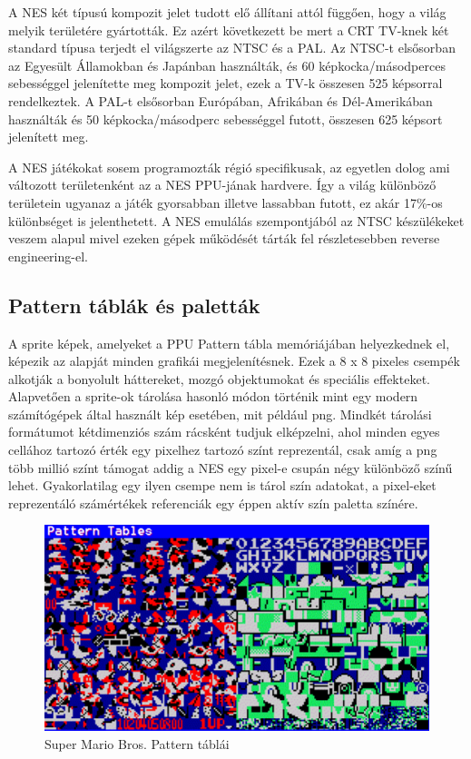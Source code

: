 	A NES két típusú kompozit jelet tudott elő állítani attól függően, hogy a világ melyik területére gyártották. Ez azért következett be mert a CRT TV-knek két standard típusa terjedt el világszerte az NTSC és a PAL. Az NTSC-t elsősorban az Egyesült Államokban és Japánban használták, és 60 képkocka/másodperces sebességgel jelenítette meg kompozit jelet, ezek a TV-k összesen 525 képsorral rendelkeztek. A PAL-t elsősorban Európában, Afrikában és Dél-Amerikában használták és 50 képkocka/másodperc sebességgel futott, összesen 625 képsort jelenített meg.
	
	A NES játékokat sosem programozták régió specifikusak, az egyetlen dolog ami változott területenként az a NES PPU-jának hardvere. Így a világ különböző területein ugyanaz a játék gyorsabban illetve lassabban futott, ez akár 17\%-os különbséget is jelenthetett. A NES emulálás szempontjából az NTSC készülékeket veszem alapul mivel ezeken gépek működését tárták fel részletesebben reverse engineering-el.
	
	\subsection{Pattern táblák és paletták}
	A sprite képek, amelyeket a PPU Pattern tábla memóriájában helyezkednek el, képezik az alapját minden grafikái megjelenítésnek. Ezek a  8 x 8 pixeles csempék alkotják a bonyolult háttereket, mozgó objektumokat és speciális effekteket. Alapvetően a sprite-ok tárolása hasonló módon történik mint egy modern számítógépek által használt kép esetében, mit például png. Mindkét tárolási formátumot kétdimenziós szám rácsként tudjuk elképzelni, ahol minden egyes cellához tartozó érték egy pixelhez tartozó színt reprezentál, csak amíg a png több millió színt támogat addig a NES egy pixel-e csupán négy különböző színű lehet. Gyakorlatilag egy ilyen csempe nem is tárol szín adatokat, a pixel-eket reprezentáló számértékek referenciák egy éppen aktív szín paletta színére.
	
	\begin{figure}[H]
		\centering
		\includegraphics[width=150mm, keepaspectratio]{figures/Mario-Patterns}
		\caption{Super Mario Bros. Pattern táblái}
		\label{fig:Mario-Pattern}
	\end{figure}
	
